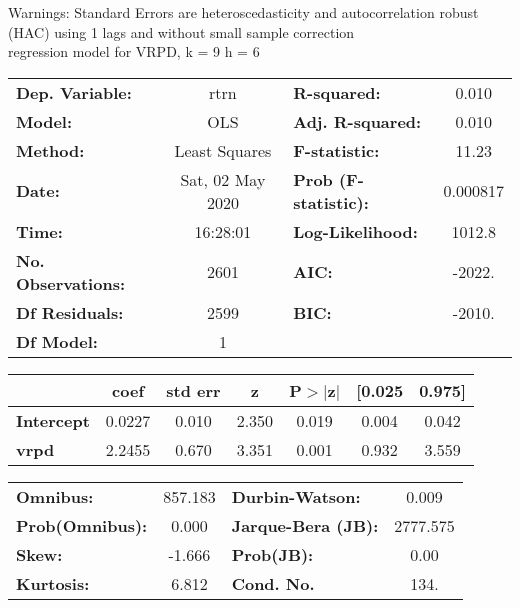 Warnings: \newline
 [1] Standard Errors are heteroscedasticity and autocorrelation robust (HAC) using 1 lags and without small sample correction\\ 

regression model for VRPD, k = 9 h = 6\begin{center}
\begin{tabular}{lclc}
\toprule
\textbf{Dep. Variable:}    &       rtrn       & \textbf{  R-squared:         } &     0.010   \\
\textbf{Model:}            &       OLS        & \textbf{  Adj. R-squared:    } &     0.010   \\
\textbf{Method:}           &  Least Squares   & \textbf{  F-statistic:       } &     11.23   \\
\textbf{Date:}             & Sat, 02 May 2020 & \textbf{  Prob (F-statistic):} &  0.000817   \\
\textbf{Time:}             &     16:28:01     & \textbf{  Log-Likelihood:    } &    1012.8   \\
\textbf{No. Observations:} &        2601      & \textbf{  AIC:               } &    -2022.   \\
\textbf{Df Residuals:}     &        2599      & \textbf{  BIC:               } &    -2010.   \\
\textbf{Df Model:}         &           1      & \textbf{                     } &             \\
\bottomrule
\end{tabular}
\begin{tabular}{lcccccc}
                   & \textbf{coef} & \textbf{std err} & \textbf{z} & \textbf{P$> |$z$|$} & \textbf{[0.025} & \textbf{0.975]}  \\
\midrule
\textbf{Intercept} &       0.0227  &        0.010     &     2.350  &         0.019        &        0.004    &        0.042     \\
\textbf{vrpd}      &       2.2455  &        0.670     &     3.351  &         0.001        &        0.932    &        3.559     \\
\bottomrule
\end{tabular}
\begin{tabular}{lclc}
\textbf{Omnibus:}       & 857.183 & \textbf{  Durbin-Watson:     } &    0.009  \\
\textbf{Prob(Omnibus):} &   0.000 & \textbf{  Jarque-Bera (JB):  } & 2777.575  \\
\textbf{Skew:}          &  -1.666 & \textbf{  Prob(JB):          } &     0.00  \\
\textbf{Kurtosis:}      &   6.812 & \textbf{  Cond. No.          } &     134.  \\
\bottomrule
\end{tabular}
\end{center}

